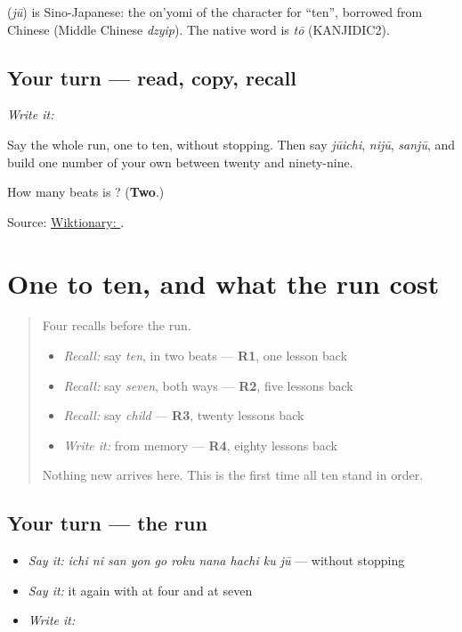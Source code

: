 \begin{cousinweb}
\textbf{} (\emph{jū}) is Sino-Japanese: the on'yomi of the character for \textquotedblleft{}ten\textquotedblright{}, borrowed from Chinese (Middle Chinese \emph{dzyip}). The native word is \emph{tō} (KANJIDIC2).
\end{cousinweb}

\subsection*{Your turn — read, copy, recall}
\emph{Write it:} \textbf{}

Say the whole run, one to ten, without stopping. Then say \emph{jūichi}, \emph{nijū}, \emph{sanjū}, and build one number of your own between twenty and ninety-nine.

\begin{tcolorbox}[breakable,colback=teal!4,colframe=teal!35!black,title={Before you move on}]
How many beats is \textbf{}? (\textbf{Two}.)

Source: \href{https://en.wiktionary.org/wiki/\%E3\%81\%98\%E3\%82\%85\%E3\%81\%86}{Wiktionary: }.
\end{tcolorbox}
\section[Practice]{One to ten, and what the run cost}

\label{lesson:JA-R15-six-to-ten}



\begin{quote}
Four recalls before the run.

\begin{itemize}
\raggedright
  \item \emph{Recall:} say \emph{ten}, in two beats — \textbf{R1}, one lesson back
  \item \emph{Recall:} say \emph{seven}, both ways — \textbf{R2}, five lessons back
  \item \emph{Recall:} say \emph{child} — \textbf{R3}, twenty lessons back
  \item \emph{Write it:} \textbf{} from memory — \textbf{R4}, eighty lessons back
\end{itemize}

Nothing new arrives here. This is the first time all ten stand in order.
\end{quote}

\subsection*{Your turn — the run}
\begin{itemize}
\raggedright
  \item \emph{Say it:} \emph{ichi ni san yon go roku nana hachi ku jū} — without stopping
  \item \emph{Say it:} it again with \textbf{} at four and \textbf{} at seven
  \item \emph{Write it:} \textbf{}
\end{itemize}

